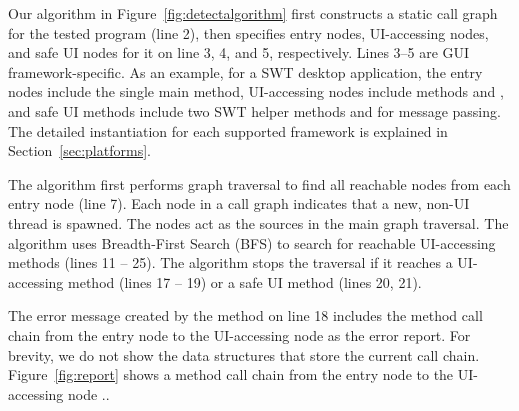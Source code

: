 Our algorithm in Figure~\ref{fig:detectalgorithm} %
first constructs a static call graph for the tested program (line 2),
then specifies entry nodes, UI-accessing nodes, and safe UI nodes
for it on line 3, 4, and 5, respectively. Lines 3--5 are GUI framework-specific.
As an example, for a SWT desktop application, the entry nodes include
the single main method, UI-accessing nodes include methods
 and  ,
and safe UI methods include two SWT helper methods   and
 for message passing. The detailed instantiation
for each supported framework is explained in Section~\ref{sec:platforms}.

The algorithm first performs graph traversal to find
all reachable 
nodes from each entry node (line 7).
Each  node in a call graph indicates that a new,
non-UI thread is spawned.  The 
nodes act as the sources in the main graph traversal.
The algorithm uses Breadth-First Search (BFS) to search for reachable UI-accessing
methods (lines 11 -- 25).
The algorithm stops the traversal if it reaches a UI-accessing
method (lines 17 -- 19) or a safe UI method (lines 20, 21).

The error message created by the method  on line 18
includes the method call chain from the entry node to the UI-accessing node
as the error report. For brevity, we do not show the data structures that store
the current call chain.
Figure~\ref{fig:report} shows a method call chain from the entry
node  to the UI-accessing node ..



